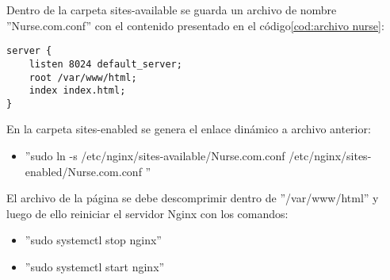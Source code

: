 \pagebreak
Dentro de la carpeta sites-available se guarda un archivo de nombre ''Nurse.com.conf'' con el contenido presentado en el código\ref{cod:archivo nurse}:

\begin{lstlisting}[label=cod:archivo nurse,caption=Archivo /etc/nginx/sites-available/Nurse.com.conf.]
server {
	listen 8024 default_server;
	root /var/www/html;
	index index.html;
}
\end{lstlisting}

En la carpeta sites-enabled se genera el enlace dinámico a archivo anterior:
\begin{itemize}
\item ''sudo ln -s /etc/nginx/sites-available/Nurse.com.conf /etc/nginx/sites-enabled/Nurse.com.conf ''
\end{itemize}

El archivo de la página se debe descomprimir dentro de ''/var/www/html'' y luego de ello reiniciar el servidor Nginx con los comandos:
\begin{itemize}
\item ''sudo systemctl stop nginx'' 
\item ''sudo systemctl start nginx''
\end{itemize}






